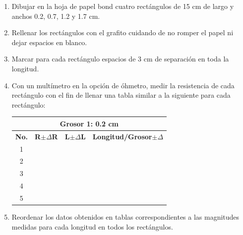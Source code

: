 \documentclass[letterpaper, 12 pt, conference]{ieeeconf}  %
\begin{document}
\begin{enumerate}
    \item Dibujar en la hoja de papel bond cuatro rectángulos de 15 cm de largo y anchos 0.2, 0.7, 1.2 y 1.7 cm. 
    \item Rellenar los rectángulos con el grafito cuidando de no romper el papel ni dejar espacios en blanco.
    \item Marcar para cada rectángulo espacios de 3 cm de separación en toda la longitud.
    \item Con un multímetro en la opción de óhmetro, medir la resistencia de cada rectángulo con el fin de llenar una tabla similar a la siguiente para cada rectángulo:
    
\begin{table}[h!]
 \centering
\begin{tabular}{|c|l|l|l|}
\hline
\multicolumn{4}{|c|}{Grosor 1: 0.2 cm}                                                                                                 \\ \hline
\multicolumn{1}{|l|}{\textbf{No.}} & \textbf{R$\pm \Delta$R} & \textbf{L$\pm \Delta$L} & \multicolumn{1}{c|}{\textbf{Longitud/Grosor$\pm \Delta$}} \\ \hline
1                                  &                         &                         &                                               \\ \hline
2                                  &                         &                         &                                               \\ \hline
3                                  &                         &                         &                                               \\ \hline
4                                  &                         &                         &                                               \\ \hline
5                                  &                         &                         &                                               \\ \hline
\end{tabular}
\end{table}

    \item Reordenar los datos obtenidos en tablas correspondientes a las magnitudes medidas para cada longitud en todos los rectángulos.


\end{enumerate}
\end{document}
